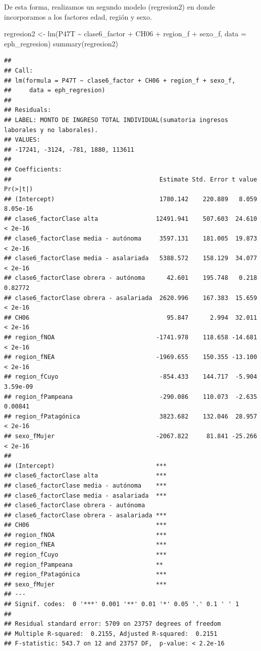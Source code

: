 \documentclass[
]{book}
\newenvironment{Shaded}{\begin{snugshade}}{\end{snugshade}}
\newcommand{\AttributeTok}[1]{\textcolor[rgb]{0.77,0.63,0.00}{#1}}
\newcommand{\FunctionTok}[1]{\textcolor[rgb]{0.00,0.00,0.00}{#1}}
\newcommand{\NormalTok}[1]{#1}
\newcommand{\OtherTok}[1]{\textcolor[rgb]{0.56,0.35,0.01}{#1}}
\newcommand{\SpecialCharTok}[1]{\textcolor[rgb]{0.00,0.00,0.00}{#1}}
\begin{document}
De esta forma, realizamos un segundo modelo (regresion2) en donde incorporamos a los factores edad, región y sexo.

\begin{Shaded}
\begin{Highlighting}[]
\NormalTok{regresion2 }\OtherTok{\textless{}{-}} \FunctionTok{lm}\NormalTok{(P47T }\SpecialCharTok{\textasciitilde{}}\NormalTok{ clase6\_factor }\SpecialCharTok{+}\NormalTok{ CH06 }\SpecialCharTok{+}\NormalTok{ region\_f }\SpecialCharTok{+}\NormalTok{ sexo\_f, }\AttributeTok{data =}\NormalTok{ eph\_regresion)}
\FunctionTok{summary}\NormalTok{(regresion2)}
\end{Highlighting}
\end{Shaded}

\begin{verbatim}
## 
## Call:
## lm(formula = P47T ~ clase6_factor + CH06 + region_f + sexo_f, 
##     data = eph_regresion)
## 
## Residuals:
## LABEL: MONTO DE INGRESO TOTAL INDIVIDUAL(sumatoria ingresos laborales y no laborales). 
## VALUES:
## -17241, -3124, -781, 1880, 113611
## 
## Coefficients:
##                                         Estimate Std. Error t value Pr(>|t|)
## (Intercept)                             1780.142    220.889   8.059 8.05e-16
## clase6_factorClase alta                12491.941    507.603  24.610  < 2e-16
## clase6_factorClase media - autónoma     3597.131    181.005  19.873  < 2e-16
## clase6_factorClase media - asalariada   5388.572    158.129  34.077  < 2e-16
## clase6_factorClase obrera - autónoma      42.601    195.748   0.218  0.82772
## clase6_factorClase obrera - asalariada  2620.996    167.383  15.659  < 2e-16
## CH06                                      95.847      2.994  32.011  < 2e-16
## region_fNOA                            -1741.978    118.658 -14.681  < 2e-16
## region_fNEA                            -1969.655    150.355 -13.100  < 2e-16
## region_fCuyo                            -854.433    144.717  -5.904 3.59e-09
## region_fPampeana                        -290.086    110.073  -2.635  0.00841
## region_fPatagónica                      3823.682    132.046  28.957  < 2e-16
## sexo_fMujer                            -2067.822     81.841 -25.266  < 2e-16
##                                           
## (Intercept)                            ***
## clase6_factorClase alta                ***
## clase6_factorClase media - autónoma    ***
## clase6_factorClase media - asalariada  ***
## clase6_factorClase obrera - autónoma      
## clase6_factorClase obrera - asalariada ***
## CH06                                   ***
## region_fNOA                            ***
## region_fNEA                            ***
## region_fCuyo                           ***
## region_fPampeana                       ** 
## region_fPatagónica                     ***
## sexo_fMujer                            ***
## ---
## Signif. codes:  0 '***' 0.001 '**' 0.01 '*' 0.05 '.' 0.1 ' ' 1
## 
## Residual standard error: 5709 on 23757 degrees of freedom
## Multiple R-squared:  0.2155, Adjusted R-squared:  0.2151 
## F-statistic: 543.7 on 12 and 23757 DF,  p-value: < 2.2e-16
\end{verbatim}
\end{document}
